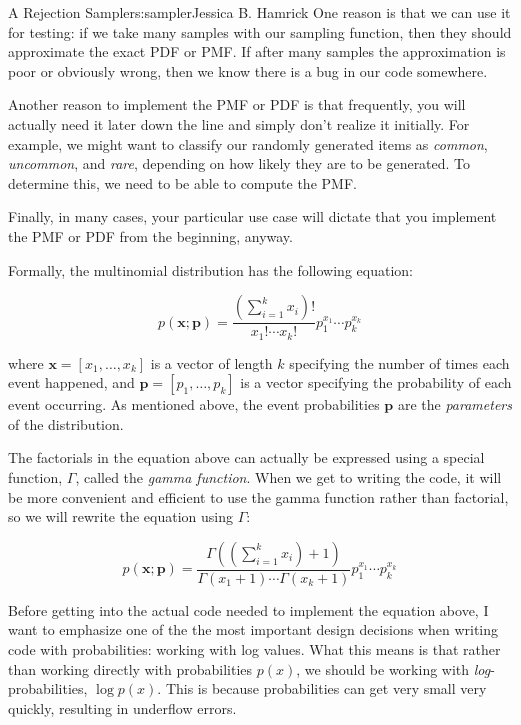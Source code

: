 \begin{aosachapter}{A Rejection Sampler}{s:sampler}{Jessica B. Hamrick}
One reason is that we can use it for testing: if we take many samples
with our sampling function, then they should approximate the exact PDF
or PMF. If after many samples the approximation is poor or obviously
wrong, then we know there is a bug in our code somewhere.

Another reason to implement the PMF or PDF is that frequently, you will
actually need it later down the line and simply don't realize it
initially. For example, we might want to classify our randomly generated
items as \emph{common}, \emph{uncommon}, and \emph{rare}, depending on
how likely they are to be generated. To determine this, we need to be
able to compute the PMF.

Finally, in many cases, your particular use case will dictate that you
implement the PMF or PDF from the beginning, anyway.

\label{the-multinomial-pmf-equation}

Formally, the multinomial distribution has the following equation:

\[
p(\mathbf{x}; \mathbf{p}) = \frac{(\sum_{i=1}^k x_i)!}{x_1!\cdots{}x_k!}p_1^{x_1}\cdots{}p_k^{x_k}
\]

where $\mathbf{x}=[x_1, \ldots{}, x_k]$ is a vector of length $k$
specifying the number of times each event happened, and
$\mathbf{p}=[p_1, \ldots{}, p_k]$ is a vector specifying the probability
of each event occurring. As mentioned above, the event probabilities
$\mathbf{p}$ are the \emph{parameters} of the distribution.

The factorials in the equation above can actually be expressed using a
special function, $\Gamma$, called the \emph{gamma function}. When we
get to writing the code, it will be more convenient and efficient to use
the gamma function rather than factorial, so we will rewrite the
equation using $\Gamma$:

\[
p(\mathbf{x}; \mathbf{p}) = \frac{\Gamma((\sum_{i=1}^k x_i)+1)}{\Gamma(x_1+1)\cdots{}\Gamma(x_k+1)}p_1^{x_1}\cdots{}p_k^{x_k}
\]

\label{working-with-log-values}

Before getting into the actual code needed to implement the equation
above, I want to emphasize one of the the most important design
decisions when writing code with probabilities: working with log values.
What this means is that rather than working directly with probabilities
$p(x)$, we should be working with \emph{log}-probabilities,
$\log{p(x)}$. This is because probabilities can get very small very
quickly, resulting in underflow errors.


\end{aosachapter}
